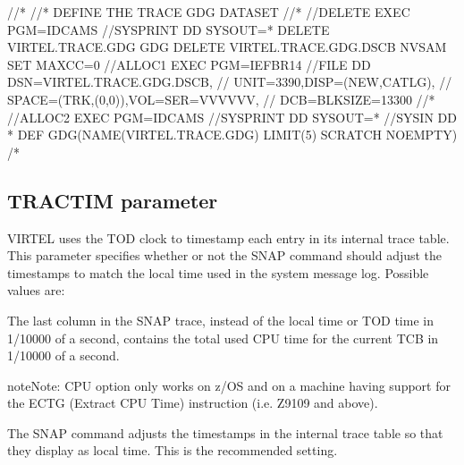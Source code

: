 \documentclass[letterpaper,10pt,english]{sphinxmanual}
\begin{document}
\begin{sphinxVerbatim}[commandchars=\\\{\}]
//*
//* DEFINE THE TRACE GDG DATASET
//*
//DELETE   EXEC PGM=IDCAMS
//SYSPRINT DD SYSOUT=*
 DELETE VIRTEL.TRACE.GDG GDG
 DELETE VIRTEL.TRACE.GDG.DSCB NVSAM
 SET MAXCC=0
//ALLOC1   EXEC PGM=IEFBR14
//FILE     DD DSN=VIRTEL.TRACE.GDG.DSCB,
//            UNIT=3390,DISP=(NEW,CATLG),
//            SPACE=(TRK,(0,0)),VOL=SER=VVVVVV,
//            DCB=BLKSIZE=13300
//*
//ALLOC2   EXEC PGM=IDCAMS
//SYSPRINT  DD SYSOUT=*
//SYSIN     DD *
 DEF GDG(NAME(VIRTEL.TRACE.GDG) LIMIT(5) SCRATCH NOEMPTY)
/*
\end{sphinxVerbatim}

\ignorespaces 

\subsection{TRACTIM parameter}
\label{\detokenize{Installation_Guide:tractim-parameter}}\label{\detokenize{Installation_Guide:index-132}}
\begin{sphinxVerbatim}[commandchars=\\\{\}]
 
\end{sphinxVerbatim}

\sphinxAtStartPar
VIRTEL uses the TOD clock to timestamp each entry in its internal trace table. This parameter specifies whether or not the SNAP command should adjust the timestamps to match the local time used in the system message log. Possible values are:

\sphinxAtStartPar
{} \sphinxhyphen{} The last column in the SNAP trace, instead of the local time or TOD time in 1/10000 of a second, contains the total used CPU time for the current TCB in 1/10000 of a second.

\begin{sphinxadmonition}{note}{Note:}
\sphinxAtStartPar
CPU option only works on z/OS and on a machine having support for the ECTG (Extract CPU Time) instruction (i.e. Z9\sphinxhyphen{}109 and above).
\end{sphinxadmonition}

\sphinxAtStartPar
{} \sphinxhyphen{} The SNAP command adjusts the timestamps in the internal trace table so that they display as local time. This is the recommended setting.
\end{document}
